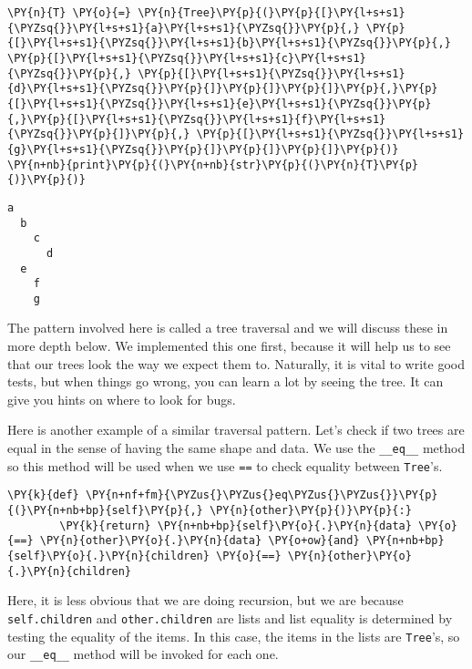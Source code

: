 \begin{Verbatim}[commandchars=\\\{\}]
\PY{n}{T} \PY{o}{=} \PY{n}{Tree}\PY{p}{(}\PY{p}{[}\PY{l+s+s1}{\PYZsq{}}\PY{l+s+s1}{a}\PY{l+s+s1}{\PYZsq{}}\PY{p}{,} \PY{p}{[}\PY{l+s+s1}{\PYZsq{}}\PY{l+s+s1}{b}\PY{l+s+s1}{\PYZsq{}}\PY{p}{,} \PY{p}{[}\PY{l+s+s1}{\PYZsq{}}\PY{l+s+s1}{c}\PY{l+s+s1}{\PYZsq{}}\PY{p}{,} \PY{p}{[}\PY{l+s+s1}{\PYZsq{}}\PY{l+s+s1}{d}\PY{l+s+s1}{\PYZsq{}}\PY{p}{]}\PY{p}{]}\PY{p}{]}\PY{p}{,}\PY{p}{[}\PY{l+s+s1}{\PYZsq{}}\PY{l+s+s1}{e}\PY{l+s+s1}{\PYZsq{}}\PY{p}{,}\PY{p}{[}\PY{l+s+s1}{\PYZsq{}}\PY{l+s+s1}{f}\PY{l+s+s1}{\PYZsq{}}\PY{p}{]}\PY{p}{,} \PY{p}{[}\PY{l+s+s1}{\PYZsq{}}\PY{l+s+s1}{g}\PY{l+s+s1}{\PYZsq{}}\PY{p}{]}\PY{p}{]}\PY{p}{]}\PY{p}{)}
\PY{n+nb}{print}\PY{p}{(}\PY{n+nb}{str}\PY{p}{(}\PY{n}{T}\PY{p}{)}\PY{p}{)}
\end{Verbatim}

\begin{Verbatim}
a
  b
    c
      d
  e
    f
    g
\end{Verbatim}


The pattern involved here is called a tree traversal and we will discuss these in more depth below.
We implemented this one first, because it will help us to see that our trees look the way we expect them to.
Naturally, it is vital to write good tests, but when things go wrong, you can learn a lot by seeing the tree.
It can give you hints on where to look for bugs.


Here is another example of a similar traversal pattern.
Let's check if two trees are equal in the sense of having the same shape and data.  We use the \texttt{\_\_eq\_\_} method so this method will be used when we use \texttt{==} to check equality between \texttt{Tree}'s.

\begin{Verbatim}[commandchars=\\\{\}]
    \PY{k}{def} \PY{n+nf+fm}{\PYZus{}\PYZus{}eq\PYZus{}\PYZus{}}\PY{p}{(}\PY{n+nb+bp}{self}\PY{p}{,} \PY{n}{other}\PY{p}{)}\PY{p}{:}
        \PY{k}{return} \PY{n+nb+bp}{self}\PY{o}{.}\PY{n}{data} \PY{o}{==} \PY{n}{other}\PY{o}{.}\PY{n}{data} \PY{o+ow}{and} \PY{n+nb+bp}{self}\PY{o}{.}\PY{n}{children} \PY{o}{==} \PY{n}{other}\PY{o}{.}\PY{n}{children}
\end{Verbatim}



Here, it is less obvious that we are doing recursion, but we are because \texttt{self.children} and \texttt{other.children} are lists and list equality is determined by testing the equality of the items.  In this case, the items in the  lists are \texttt{Tree}'s, so our \texttt{\_\_eq\_\_} method will be invoked for each one.


